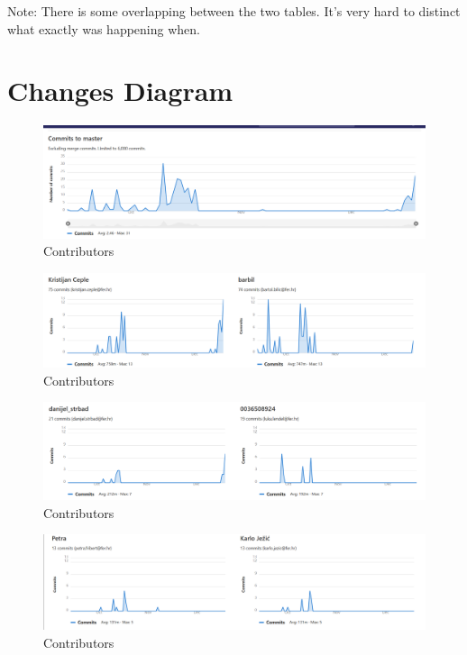 		Note: There is some overlapping between the two tables. It's very hard to distinct what exactly was happening when.
		\eject
		\section*{Changes Diagram}
		
		\begin{figure}[H]
			\includegraphics[width=\linewidth]{images/contribs_1.png}
			\caption{Contributors}
			\label{fig:contribs_1}
		\end{figure}
	
		\begin{figure}[H]
			\includegraphics[width=\linewidth]{images/contribs_2.png}
			\caption{Contributors}
			\label{fig:contribs_2}
		\end{figure}

		\begin{figure}[H]
			\includegraphics[width=\linewidth]{images/contribs_3.png}
			\caption{Contributors}
			\label{fig:contribs_3}
		\end{figure}

		\begin{figure}[H]
			\includegraphics[width=\linewidth]{images/contribs_4.png}
			\caption{Contributors}
			\label{fig:contribs_4}
		\end{figure}

